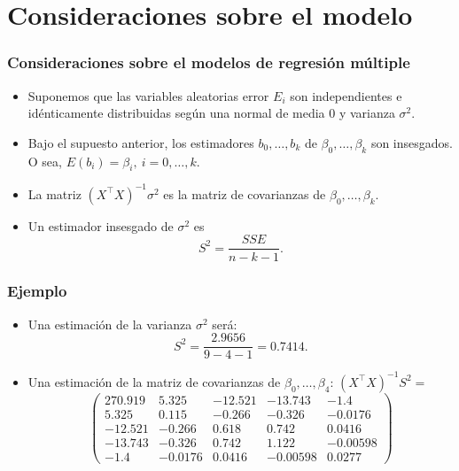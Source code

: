 \section{Consideraciones sobre el modelo}
\begin{frame}
\frametitle{Consideraciones sobre el modelos de regresión múltiple}
\begin{itemize}
\item<2->{Suponemos que las variables aleatorias error $E_i$ son
independientes e idénticamente distribuidas  según una normal de
media $0$ y varianza $\sigma^2$.}
\item<3->{Bajo el supuesto anterior,
los estimadores $b_0,\ldots, b_k$ de
$\beta_0,\ldots,\beta_k$ son insesgados. O sea, $E(b_i)=\beta_i,\ i=0,\ldots, k$.}
\item<4->{La matriz $(X^\top X)^{-1} \sigma^2$ es la matriz de covarianzas de
$\beta_0,\ldots,\beta_k$.}
\item<5->{Un estimador insesgado de
$\sigma^2$ es $$S^2=\frac{SSE}{n-k-1}.$$}
\end{itemize}
\end{frame}
\begin{frame}
\frametitle{Ejemplo}
\begin{itemize}
\item<2->{Una estimación de la varianza $\sigma^2$ será:
$$
S^2 = \frac{2.9656}{9-4-1}=0.7414.
$$}
\item<3->{Una estimación de la matriz de covarianzas de $\beta_0,\ldots, \beta_4$: $(X^\top X)^{-1} S^2 = $
$$
\left(
\begin{array}{lllll}
270.919 & 5.325 &  -12.521 &  -13.743 &  -1.4 \\
5.325 & 0.115 & -0.266 & -0.326 & -0.0176 \\
-12.521 &  -0.266 & 0.618 &  0.742 & 0.0416 \\
-13.743 &  -0.326 &  0.742 &  1.122 &  -0.00598 \\
-1.4 & -0.0176 & 0.0416 &  -0.00598 &  0.0277
\end{array}
\right)
$$}
\end{itemize}
\end{frame}
